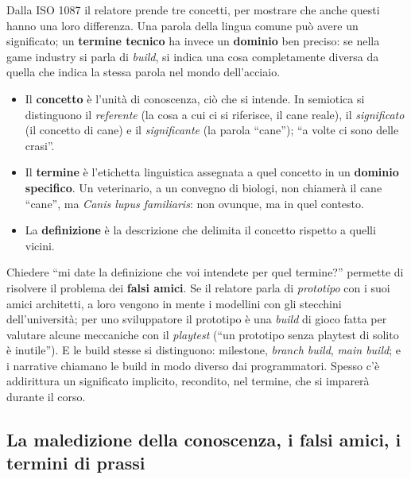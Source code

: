 Dalla ISO 1087 il relatore prende tre concetti, per mostrare che anche questi
hanno una loro differenza. Una parola della lingua comune può avere un
significato; un \textbf{termine tecnico} ha invece un \textbf{dominio} ben
preciso: se nella game industry si parla di \emph{build}, si indica una cosa
completamente diversa da quella che indica la stessa parola nel mondo
dell'acciaio.
\begin{itemize}
  \item Il \textbf{concetto} è l'unità di conoscenza, ciò che si intende. In
        semiotica si distinguono il \emph{referente} (la cosa a cui ci si
        riferisce, il cane reale), il \emph{significato} (il concetto di cane)
        e il \emph{significante} (la parola ``cane''); ``a volte ci sono delle
        crasi''.
  \item Il \textbf{termine} è l'etichetta linguistica assegnata a quel concetto
        in un \textbf{dominio specifico}. Un veterinario, a un convegno di
        biologi, non chiamerà il cane ``cane'', ma \emph{Canis lupus
        familiaris}: non ovunque, ma in quel contesto.
  \item La \textbf{definizione} è la descrizione che delimita il concetto
        rispetto a quelli vicini.
\end{itemize}
Chiedere ``mi date la definizione che voi intendete per quel termine?''
permette di risolvere il problema dei \textbf{falsi amici}. Se il relatore parla
di \emph{prototipo} con i suoi amici architetti, a loro vengono in mente i
modellini con gli stecchini dell'università; per uno sviluppatore il prototipo
è una \emph{build} di gioco fatta per valutare alcune meccaniche con il
\emph{playtest} (``un prototipo senza playtest di solito è inutile''). E le
build stesse si distinguono: milestone, \emph{branch build}, \emph{main
build}; e i narrative chiamano le build in modo diverso dai programmatori.
Spesso c'è addirittura un significato implicito, recondito, nel termine, che
si imparerà durante il corso.

\subsection{La maledizione della conoscenza, i falsi amici, i termini di prassi}

